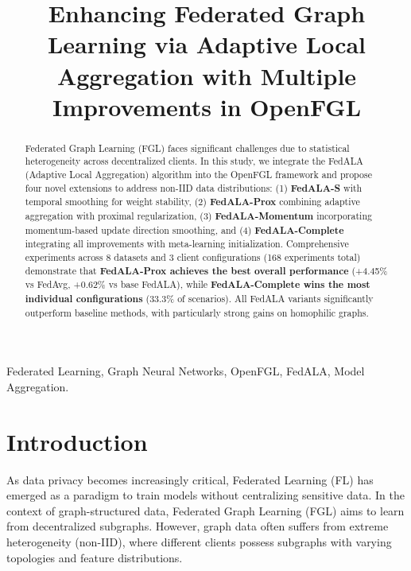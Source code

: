 \documentclass[10pt,conference,compsocconf,letterpaper]{IEEEtran}
\begin{document}
\title{Enhancing Federated Graph Learning via Adaptive Local Aggregation with Multiple Improvements in OpenFGL}

\author{
\and
{}
}

\maketitle

\begin{abstract}
Federated Graph Learning (FGL) faces significant challenges due to statistical heterogeneity across decentralized clients. In this study, we integrate the FedALA (Adaptive Local Aggregation) algorithm into the OpenFGL framework and propose four novel extensions to address non-IID data distributions: (1) \textbf{FedALA-S} with temporal smoothing for weight stability, (2) \textbf{FedALA-Prox} combining adaptive aggregation with proximal regularization, (3) \textbf{FedALA-Momentum} incorporating momentum-based update direction smoothing, and (4) \textbf{FedALA-Complete} integrating all improvements with meta-learning initialization. Comprehensive experiments across 8 datasets and 3 client configurations (168 experiments total) demonstrate that \textbf{FedALA-Prox achieves the best overall performance} (+4.45\% vs FedAvg, +0.62\% vs base FedALA), while \textbf{FedALA-Complete wins the most individual configurations} (33.3\% of scenarios). All FedALA variants significantly outperform baseline methods, with particularly strong gains on homophilic graphs.
\end{abstract}

\begin{IEEEkeywords}
Federated Learning, Graph Neural Networks, OpenFGL, FedALA, Model Aggregation.
\end{IEEEkeywords}

\section{Introduction}
As data privacy becomes increasingly critical, Federated Learning (FL) has emerged as a paradigm to train models without centralizing sensitive data. In the context of graph-structured data, Federated Graph Learning (FGL) aims to learn from decentralized subgraphs. However, graph data often suffers from extreme heterogeneity (non-IID), where different clients possess subgraphs with varying topologies and feature distributions.
\end{document}
